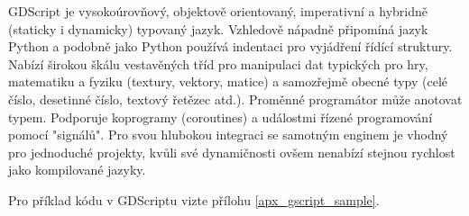 GDScript je vysokoúrovňový, objektově orientovaný, imperativní a hybridně (staticky i dynamicky) typovaný jazyk. Vzhledově nápadně připomíná jazyk Python a podobně jako Python používá indentaci pro vyjádření řídící struktury. Nabízí širokou škálu vestavěných tříd pro manipulaci dat typických pro hry, matematiku a fyziku (textury, vektory, matice) a samozřejmě obecné typy (celé číslo, desetinné číslo, textový řetězec atd.). Proměnné programátor může anotovat typem. Podporuje koprogramy (coroutines) a událostmi řízené programování pomocí "signálů". Pro svou hlubokou integraci se samotným enginem je vhodný pro jednoduché projekty, kvůli své dynamičnosti ovšem nenabízí stejnou rychlost jako kompilované jazyky. \cite{gdscript_reference}

Pro příklad kódu v GDScriptu vizte přílohu \ref{apx_gscript_sample}.